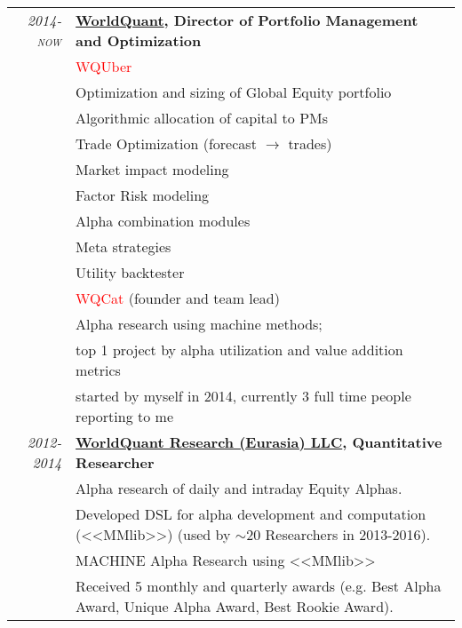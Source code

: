 \documentclass[unicode,a4paper,10pt]{article}
\begin{document}
\begin{tabular}{r p{13cm}}
 \emph{\textsc{2014-now}} & \textbf{\href{https://www.worldquant.com/}{WorldQuant}, Director of Portfolio Management and Optimization} \\
&\footnotesize{\textcolor{red}{WQUber}} \\
&\footnotesize{\hspace{0.5cm} Optimization and sizing of Global Equity portfolio}\\
&\footnotesize{\hspace{0.5cm} Algorithmic allocation of capital to PMs}\\
&\footnotesize{\hspace{0.5cm} Trade Optimization (forecast $\to$ trades)}\\
&\footnotesize{\hspace{0.5cm} Market impact modeling}\\
&\footnotesize{\hspace{0.5cm} Factor Risk modeling}\\
&\footnotesize{\hspace{0.5cm} Alpha combination modules}\\
&\footnotesize{\hspace{0.5cm} Meta strategies}\\
&\footnotesize{\hspace{0.5cm} Utility backtester}\\
&\footnotesize{\textcolor{red}{WQCat}} (founder and team lead)\\
&\footnotesize{\hspace{0.5cm} Alpha research using machine methods;} \\
&\footnotesize{\hspace{0.5cm} top 1 project by alpha utilization and value addition metrics}\\
&\footnotesize{\hspace{0.5cm} started by myself in 2014, currently 3 full time people reporting to me}\\
\emph{\textsc{2012-2014}} & \textbf{\href{https://www.worldquant.com/}{WorldQuant Research (Eurasia) LLC}, Quantitative Researcher} \\
&\footnotesize{Alpha research of daily and intraday Equity Alphas.}\\
&\footnotesize{Developed DSL for alpha development and computation (<<MMlib>>) (used by $\sim$20 Researchers in 2013-2016).}\\
&\footnotesize{MACHINE Alpha Research using <<MMlib>>}\\
&\footnotesize{Received 5 monthly and quarterly awards (e.g. Best Alpha Award, Unique Alpha Award, Best Rookie Award).}\\



\end{tabular}
\end{document}
